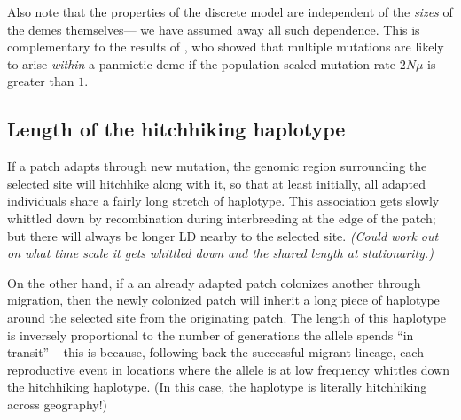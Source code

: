 \documentclass{article}
\newcommand{\plr}[1]{{\it\color{blue}(#1)}}
\begin{document}

Also note that the properties of the discrete model are independent of the {\em sizes} of the demes themselves--- we have assumed away all such dependence.
This is complementary to the results of \cite{softsweepsII}, who showed that multiple mutations are likely to arise {\em within} a panmictic deme
if the population-scaled mutation rate $2 N \mu$ is greater than $1$.


\subsection{Length of the hitchhiking haplotype}

If a patch adapts through new mutation, the genomic region surrounding the selected site will hitchhike \citep{hitchhiking} along with it,
so that at least initially, all adapted individuals share a fairly long stretch of haplotype.
This association gets slowly whittled down by recombination during interbreeding at the edge of the patch;
but there will always be longer LD nearby to the selected site.
\plr{Could work out on what time scale it gets whittled down and the shared length at stationarity.}

On the other hand, if a an already adapted patch colonizes another through migration,
then the newly colonized patch will inherit a long piece of haplotype around the selected site from the originating patch.
The length of this haplotype is inversely proportional to the number of generations the allele spends ``in transit'' --
this is because, following back the successful migrant lineage, 
each reproductive event in locations where the allele is at low frequency
whittles down the hitchhiking haplotype.
(In this case, the haplotype is literally hitchhiking across geography!)
\end{document}
